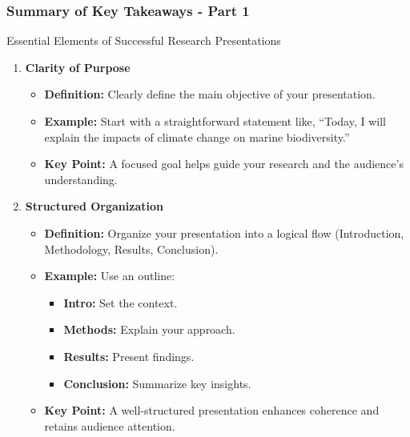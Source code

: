 \documentclass[aspectratio=169]{beamer}
\begin{document}
\begin{frame}[fragile]
    \frametitle{Summary of Key Takeaways - Part 1}
    \begin{block}{Essential Elements of Successful Research Presentations}
        \begin{enumerate}
            \item \textbf{Clarity of Purpose}
                \begin{itemize}
                    \item \textbf{Definition:} Clearly define the main objective of your presentation.
                    \item \textbf{Example:} Start with a straightforward statement like, “Today, I will explain the impacts of climate change on marine biodiversity.”
                    \item \textbf{Key Point:} A focused goal helps guide your research and the audience’s understanding.
                \end{itemize}
            \item \textbf{Structured Organization}
                \begin{itemize}
                    \item \textbf{Definition:} Organize your presentation into a logical flow (Introduction, Methodology, Results, Conclusion).
                    \item \textbf{Example:} Use an outline:
                    \begin{itemize}
                        \item \textbf{Intro:} Set the context.
                        \item \textbf{Methods:} Explain your approach.
                        \item \textbf{Results:} Present findings.
                        \item \textbf{Conclusion:} Summarize key insights.
                    \end{itemize}
                    \item \textbf{Key Point:} A well-structured presentation enhances coherence and retains audience attention.
                \end{itemize}
        \end{enumerate}
    \end{block}
\end{frame}
\end{document}
